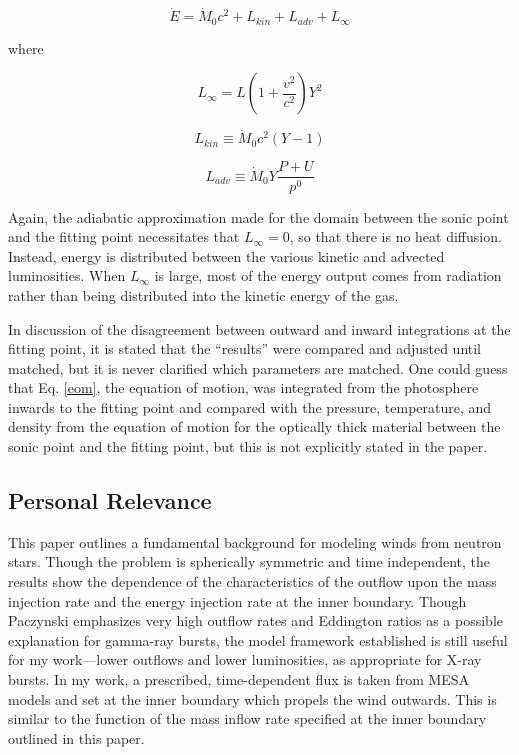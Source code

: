 \documentclass[onecolumn]{aastex63}
\begin{document}
\begin{equation}
    \dot E = \dot M_0 c^2 + L_{kin} + L_{adv} + L_{\infty}
\end{equation}

where 

\begin{equation} \label{infty}
    L_\infty = L\left(1 + \frac{v^2}{c^2}\right) Y^2
\end{equation}

\begin{equation}
    L_{kin} \equiv \dot M_0 c^2 (Y - 1)
\end{equation}

\begin{equation}
    L_{adv} \equiv \dot M_0 Y \frac{P + U}{p^0}
\end{equation}

Again, the adiabatic approximation made for the domain between the sonic point and the fitting point necessitates that $L_\infty = 0$, so that there is no heat diffusion. Instead, energy is distributed between the various kinetic and advected luminosities. When $L_\infty$ is large, most of the energy output comes from radiation rather than being distributed into the kinetic energy of the gas.

In discussion of the disagreement between outward and inward integrations at the fitting point, it is stated that the ``results'' were compared and adjusted until matched, but it is never clarified which parameters are matched. One could guess that Eq. \ref{eom}, the equation of motion, was integrated from the photosphere inwards to the fitting point and compared with the pressure, temperature, and density from the equation of motion for the optically thick material between the sonic point and the fitting point, but this is not explicitly stated in the paper. 

\subsection{Personal Relevance}
This paper outlines a fundamental background for modeling winds from neutron stars. Though the problem is spherically symmetric and time independent, the results show the dependence of the characteristics of the outflow upon the mass injection rate and the energy injection rate at the inner boundary. Though Paczynski emphasizes very high outflow rates and Eddington ratios as a possible explanation for gamma-ray bursts, the model framework established is still useful for my work---lower outflows and lower luminosities, as appropriate for X-ray bursts. In my work, a prescribed, time-dependent flux is taken from MESA models and set at the inner boundary which propels the wind outwards. This is similar to the function of the mass inflow rate specified at the inner boundary outlined in this paper.
\end{document}
